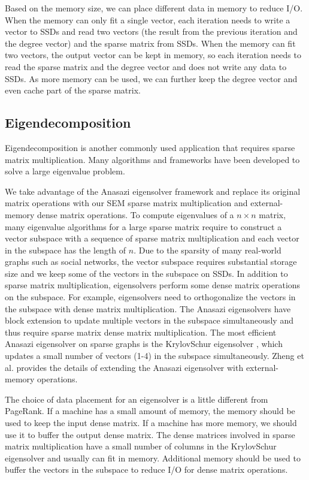 Based on the memory size, we can place different data in memory to reduce I/O.
When the memory can only fit a single vector, each iteration needs
to write a vector to SSDs and read two vectors (the result from
the previous iteration and the degree vector) and the sparse matrix
from SSDs. When the memory can fit two vectors, the output vector can be kept
in memory, so each iteration needs to read the sparse matrix and the degree vector
and does not write any data to SSDs. As more memory can be used, we can
further keep the degree vector and even cache part of the sparse matrix.

\subsection{Eigendecomposition}
Eigendecomposition is another commonly
used application that requires sparse matrix multiplication. Many
algorithms \cite{Lanczos, IRLM, krylovschur} and frameworks
\cite{arpack, anasazi, slepc} have been developed to solve a large eigenvalue
problem.

We take advantage of the Anasazi eigensolver framework \cite{anasazi} and
replace its original matrix operations with our SEM sparse
matrix multiplication and external-memory dense matrix operations. To compute
eigenvalues of a $n \times n$ matrix, many eigenvalue algorithms for a large
sparse matrix require to construct a vector subspace with a sequence of
sparse matrix multiplication and each vector in the subspace has the length of $n$.
Due to the sparsity of many real-world graphs such as social networks,
the vector subspace requires substantial storage size and we keep
some of the vectors in the subspace on SSDs. In addition to sparse matrix
multiplication, eigensolvers perform some dense matrix operations on the subspace.
For example, eigensolvers need to orthogonalize the vectors in the subspace with
dense matrix multiplication. The Anasazi eigensolvers have block extension to
update multiple
vectors in the subspace simultaneously and thus require sparse matrix dense
matrix multiplication. The most efficient Anasazi eigensolver on sparse graphs
is the KrylovSchur eigensolver \cite{krylovschur}, which updates a small number
of vectors (1-4) in the subspace simultaneously. Zheng et al.
\cite{flasheigen} provides the details of extending the Anasazi eigensolver
with external-memory operations.

The choice of data placement for an eigensolver is a little different from
PageRank. If a machine has a small amount of memory, the memory should be
used to keep the input dense matrix. If a machine has more memory, we should
use it to buffer the output dense matrix. The dense matrices involved in
sparse matrix multiplication have a small number of columns in
the KrylovSchur eigensolver and usually can fit in memory. 
Additional memory should be used to buffer the vectors in the subspace
to reduce I/O for dense matrix operations.

